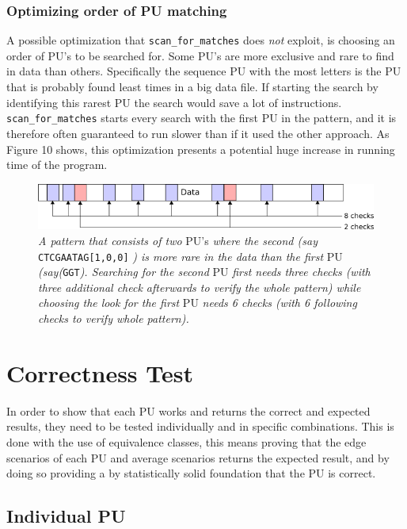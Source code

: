 \documentclass[12pt]{article}
\newcommand{\scm}{\texttt{scan\_for\_matches} }
\newcommand{\pu}{PU }
\newcommand{\pus}{PU's }
\begin{document}
\subsubsection{Optimizing order of \pu matching}
A possible optimization that \scm does \textit{not} exploit, is choosing an order of \pus to be searched for.
Some \pus are more exclusive and rare to find in data than others. Specifically the sequence \pu with the most
letters is the \pu that is probably found least times in a big data file. If starting the search by
identifying this rarest \pu the search would save a lot of instructions. \scm starts every search with the 
first \pu in the pattern, and it is therefore often guaranteed to run slower than if it used the other approach.
As Figure 10 shows, this optimization presents a potential huge increase in running time of the program. \newpage
\begin{figure}[H]
\begin{center}
\includegraphics[scale=0.8]{Diagrams/opti.png}
\end{center}
\caption{\textit{A pattern that consists of two} \pus \textit{where the second (say} \texttt{CTCGAATAG[1,0,0]}
\textit{) is more rare in the data than the first} \pu \textit{(say(}\texttt{GGT}\textit{). Searching for the 
second} \pu \textit{first needs three checks (with three additional check afterwards to verify the whole pattern)
while choosing the look for the first} \pu \textit{needs 6 checks (with 6 following checks to verify whole pattern).}}
\end{figure}
\section{Correctness Test}
In order to show that each \pu works and returns the correct and expected results, they need to be tested individually and in specific combinations. This is done with the use of equivalence classes, this means proving that the edge scenarios of each 
\pu and average scenarios returns the expected result, and by doing so providing a by statistically solid foundation that 
the \pu is correct. 
\subsection{Individual \pu}
\end{document}
